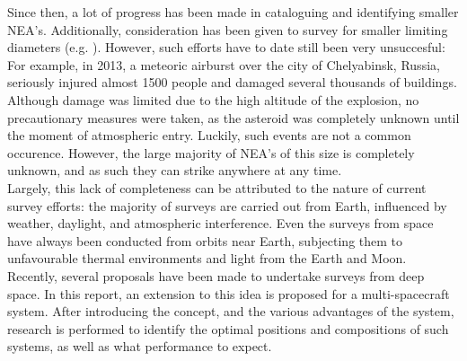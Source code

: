 Since then, a lot of progress has been made in cataloguing and identifying smaller NEA's. Additionally, consideration has been given to survey for smaller limiting diameters (e.g. \cite{2003NEOSDT}). However, such efforts have to date still been very unsuccesful: For example, in 2013, a meteoric airburst over the city of Chelyabinsk, Russia, seriously injured almost 1500 people and damaged several thousands of buildings. Although damage was limited due to the high altitude of the explosion, no precautionary measures were taken, as the asteroid was completely unknown until the moment of atmospheric entry. Luckily, such events are not a common occurence. However, the large majority of NEA's of this size is completely unknown, and as such they can strike anywhere at any time. \\

Largely, this lack of completeness can be attributed to the nature of current survey efforts: the majority of surveys are carried out from Earth, influenced by weather, daylight, and atmospheric interference. Even the surveys from space have always been conducted from orbits near Earth, subjecting them to unfavourable thermal environments and light from the Earth and Moon. Recently, several proposals have been made to undertake surveys from deep space. In this report, an extension to this idea is proposed for a multi-spacecraft system. After introducing the concept, and the various advantages of the system, research is performed to identify the optimal positions and compositions of such systems, as well as what performance to expect.
